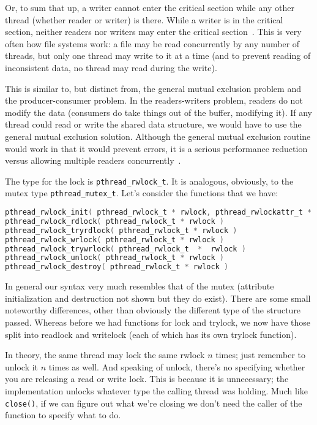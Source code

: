 Or, to sum that up, a writer cannot enter the critical section while any other thread (whether reader or writer) is there. While a writer is in the critical section, neither readers nor writers may enter the critical section~\cite{lbs}. This is very often how file systems work: a file may be read concurrently by any number of threads, but only one thread may write to it at a time (and to prevent reading of inconsistent data, no thread may read during the write).

This is similar to, but distinct from, the general mutual exclusion problem and the producer-consumer problem. In the readers-writers problem, readers do not modify the data (consumers do take things out of the buffer, modifying it). If any thread could read or write the shared data structure, we would have to use the general mutual exclusion solution. Although the general mutual exclusion routine would work in that it would prevent errors, it is a serious performance reduction versus allowing multiple readers concurrently~\cite{osi}.

The type for the lock is \texttt{pthread\_rwlock\_t}. It is analogous, obviously, to the mutex type \texttt{pthread\_mutex\_t}. Let's consider the functions that we have:

\begin{lstlisting}[language=C]
pthread_rwlock_init( pthread_rwlock_t * rwlock, pthread_rwlockattr_t * attr )
pthread_rwlock_rdlock( pthread_rwlock_t * rwlock )
pthread_rwlock_tryrdlock( pthread_rwlock_t * rwlock )
pthread_rwlock_wrlock( pthread_rwlock_t * rwlock )
pthread_rwlock_trywrlock( pthread_rwlock_t  *  rwlock )
pthread_rwlock_unlock( pthread_rwlock_t * rwlock )
pthread_rwlock_destroy( pthread_rwlock_t * rwlock )
\end{lstlisting}

In general our syntax very much resembles that of the mutex (attribute initialization and destruction not shown but they do exist). There are some small noteworthy differences, other than obviously the different type of the structure passed. Whereas before we had functions for lock and trylock, we now have those split into readlock and writelock (each of which has its own trylock function). 

In theory, the same thread may lock the same rwlock $n$ times; just remember to unlock it $n$ times as well. And speaking of unlock, there's no specifying whether you are releasing a read or write lock. This is because it is unnecessary; the implementation unlocks whatever type the calling thread was holding. Much like \texttt{close()}, if we can figure out what we're closing we don't need the caller of the function to specify what to do.

